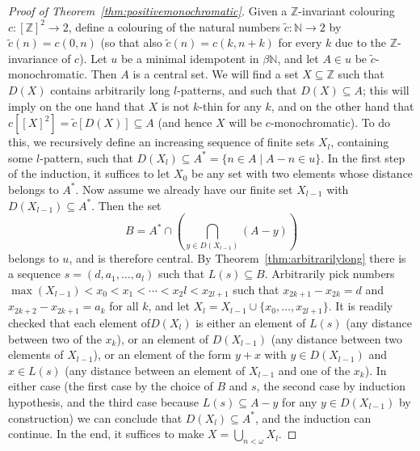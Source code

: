 \documentclass{amsart}
\theoremstyle{definition}
\theoremstyle{remark}
\numberwithin{equation}{section}
\begin{document}
\begin{proof}[Proof of Theorem~\ref{thm:positivemonochromatic}]
Given a $\mathbb Z$-invariant colouring $c:[\mathbb Z]^2\longrightarrow 2$, define a colouring of the natural numbers $\tilde{c}:\mathbb N\longrightarrow 2$ by $\tilde{c}(n)=c(0,n)$ (so that also $\tilde{c}(n)=c(k,n+k)$ for every $k$ due to the $\mathbb Z$-invariance of $c$). Let $u$ be a minimal idempotent in $\beta\mathbb N$, and let $A\in u$ be $\tilde{c}$-monochromatic. Then $A$ is a central set. We will find a set $X\subseteq\mathbb Z$ such that $D(X)$ contains arbitrarily long $l$-patterns, and such that $D(X)\subseteq A$; this will imply on the one hand that $X$ is not $k$-thin for any $k$, and on the other hand that $c[[X]^2]=\tilde{c}[D(X)]\subseteq A$ (and hence $X$ will be $c$-monochromatic). To do this, we recursively define an increasing sequence of finite sets $X_l$, containing some $l$-pattern, such that $D(X_l)\subseteq A^*=\{n\in A\mid A-n\in u\}$. In the first step of the induction, it suffices to let $X_0$ be any set with two elements whose distance belongs to $A^*$. Now assume we already have our finite set $X_{l-1}$ with $D(X_{l-1})\subseteq A^*$. Then the set
\begin{equation*}
    B=A^*\cap\left(\bigcap_{y\in D(X_{l-1})}(A-y)\right)
\end{equation*}
belongs to $u$, and is therefore central. By Theorem~\ref{thm:arbitrarilylong} there is a sequence $s=(d,a_1,\ldots,a_l)$ such that $L(s)\subseteq B$. Arbitrarily pick numbers $\max(X_{l-1})<x_0<x_1<\cdots<x_2l<x_{2l+1}$ such that $x_{2k+1}-x_{2k}=d$ and $x_{2k+2}-x_{2k+1}=a_k$ for all $k$, and let $X_l=X_{l-1}\cup\{x_0,\ldots,x_{2l+1}\}$. It is readily checked that each element of$ D(X_l)$ is either an element of $L(s)$ (any distance between two of the $x_k$), or an element of $D(X_{l-1})$ (any distance between two elements of $X_{l-1}$), or an element of the form $y+x$ with $y\in D(X_{l-1})$ and $x\in L(s)$ (any distance between an element of $X_{l-1}$ and one of the $x_k$). In either case (the first case by the choice of $B$ and $s$, the second case by induction hypothesis, and the third case because $L(s)\subseteq A-y$ for any $y\in D(X_{l-1})$ by construction) we can conclude that $D(X_l)\subseteq A^*$, and the induction can continue. In the end, it suffices to make $X=\bigcup_{n<\omega}X_l$.
\end{proof}
\end{document}
